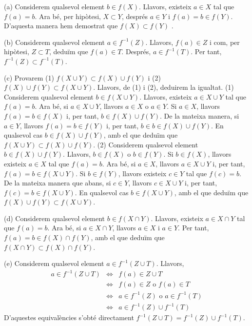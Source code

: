 \begin{solucio}
(a) Considerem qualsevol element $b\in f(X)$. Llavors, existeix $a\in X$ tal
que $f(a)=b$. Ara bé, per hipòtesi, $X\subset Y$, després $a\in
Y $ i $f(a)=b\in f(Y)$. D'aquesta manera hem demostrat que $f(X)\subset f(Y)$%
.

(b) Considerem qualsevol element $a\in f^{-1}(Z)$. Llavors, $f(a)\in Z$ i
com, per hipòtesi, $Z\subset T$, deduïm que $f(a)\in T$. Després, $a\in f^{-1}(T)$. Per tant, $f^{-1}(Z)\subset f^{-1}(T)$.

(c) Provarem (1) $f(X\cup Y)\subset f(X)\cup f(Y)$ i (2) $f(X)\cup
f(Y)\subset f(X\cup Y)$. Llavors, de (1) i (2), deduirem la igualtat. (1)
Considerem qualsevol element $b\in f(X\cup Y)$. Llavors, existeix $a\in
X\cup Y$ tal que $f(a)=b$. Ara bé, si $a\in X\cup Y$, llavors $a\in X$ o
$a\in Y$. Si $a\in X$, llavors $f(a)=b\in f(X)$ i, per tant, $b\in f(X)\cup
f(Y)$. De la mateixa manera, si $a\in Y$, llavors $f(a)=b\in f(Y)$ i, per
tant, $b\in b\in f(X)\cup f(Y)$. En qualsevol cas $b\in f(X)\cup f(Y)$, amb
el que deduïm que $f(X\cup Y)\subset f(X)\cup f(Y)$. (2) Considerem
qualsevol element $b\in f(X)\cup f(Y)$. Llavors, $b\in f(X)$ o $b\in f(Y)$.
Si $b\in f(X)$, llavors existeix $a\in X$ tal que $f(a)=b$. Ara bé, si $%
a\in X$, llavors $a\in X\cup Y$ i, per tant, $f(a)=b\in f(X\cup Y)$. Si $%
b\in f(Y)$, llavors existeix $c\in Y$ tal que $f(c)=b$. De la mateixa manera
que abans, si $c\in Y$, llavors $c\in X\cup Y$ i, per tant, $f(c)=b\in
f(X\cup Y)$. En qualsevol cas $b\in f(X\cup Y)$, amb el que deduïm que $%
f(X)\cup f(Y)\subset f(X\cup Y)$.

(d) Considerem qualsevol element $b\in f(X\cap Y)$. Llavors, existeix $a\in
X\cap Y$ tal que $f(a)=b$. Ara bé, si $a\in X\cap Y$, llavors $a\in X$ i
$a\in Y$. Per tant, $f(a)=b\in f(X)\cap f(Y)$, amb el que deduïm que $%
f(X\cap Y)\subset f(X)\cap f(Y)$.

(e) Considerem qualsevol element $a\in f^{-1}(Z\cup T)$. Llavors,
\begin{equation*}
\begin{array}{lll}
a\in f^{-1}(Z\cup T) & \Longleftrightarrow & f(a)\in Z\cup T \\
& \Longleftrightarrow & f(a)\in Z\text{ \ o \ }f(a)\in T \\
& \Longleftrightarrow & a\in f^{-1}(Z)\text{ \ o \ }a\in f^{-1}(T) \\
& \Longleftrightarrow & a\in f^{-1}(Z)\cup f^{-1}(T)%
\end{array}%
\end{equation*}%
D'aquestes equivalències s'obté directament $f^{-1}(Z\cup
T)=f^{-1}(Z)\cup f^{-1}(T)$.


\end{solucio}
